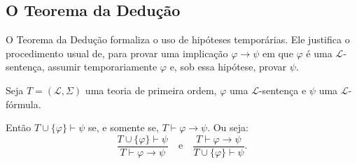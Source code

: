 \subsection{O Teorema da Dedução}

O Teorema da Dedução formaliza o uso de hipóteses temporárias.
Ele justifica o procedimento usual de, para provar uma implicação $\varphi\rightarrow\psi$ em que $\varphi$ é uma $\mathcal L$-sentença, assumir temporariamente $\varphi$ e, sob essa hipótese, provar $\psi$.

\begin{metatheorem}\label{mteo:teoremaDaDeducaoFO}\label{mthm:teoremaDaDeducao}
    Seja $T=(\mathcal L,\Sigma)$ uma teoria de primeira ordem, $\varphi$ uma $\mathcal L$-sentença e $\psi$ uma $\mathcal L$-fórmula.

    Então $T\cup\{\varphi\}\vdash \psi$ se, e somente se, $T\vdash \varphi\rightarrow\psi$.
    Ou seja:
    \[
        \frac{T\cup\{\varphi\}\vdash \psi}
             {T\vdash \varphi\rightarrow\psi} \quad \text{e}\quad \frac{T\vdash \varphi\rightarrow\psi}
             {T\cup\{\varphi\}\vdash \psi}.
    \]
\end{metatheorem}


